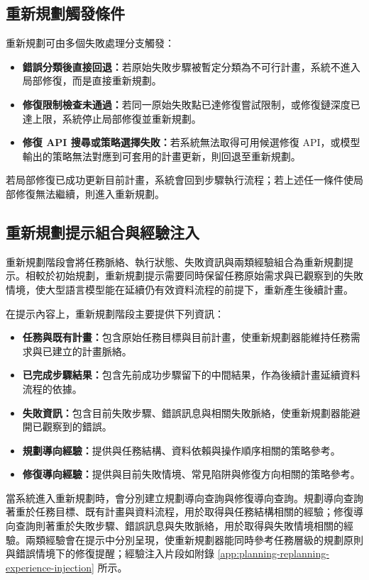\begin{ZhChapter}
\subsection{重新規劃觸發條件}

重新規劃可由多個失敗處理分支觸發：

\begin{itemize}
    \item \textbf{錯誤分類後直接回退：}若原始失敗步驟被暫定分類為不可行計畫，系統不進入局部修復，而是直接重新規劃。
    \item \textbf{修復限制檢查未通過：}若同一原始失敗點已達修復嘗試限制，或修復鏈深度已達上限，系統停止局部修復並重新規劃。
    \item \textbf{修復 API 搜尋或策略選擇失敗：}若系統無法取得可用候選修復 API，或模型輸出的策略無法對應到可套用的計畫更新，則回退至重新規劃。
\end{itemize}

若局部修復已成功更新目前計畫，系統會回到步驟執行流程；若上述任一條件使局部修復無法繼續，則進入重新規劃。

\subsection{重新規劃提示組合與經驗注入}

重新規劃階段會將任務脈絡、執行狀態、失敗資訊與兩類經驗組合為重新規劃提示。相較於初始規劃，重新規劃提示需要同時保留任務原始需求與已觀察到的失敗情境，使大型語言模型能在延續仍有效資料流程的前提下，重新產生後續計畫。

在提示內容上，重新規劃階段主要提供下列資訊：

\begin{itemize}
    \item \textbf{任務與既有計畫：}包含原始任務目標與目前計畫，使重新規劃器能維持任務需求與已建立的計畫脈絡。
    \item \textbf{已完成步驟結果：}包含先前成功步驟留下的中間結果，作為後續計畫延續資料流程的依據。
    \item \textbf{失敗資訊：}包含目前失敗步驟、錯誤訊息與相關失敗脈絡，使重新規劃器能避開已觀察到的錯誤。
    \item \textbf{規劃導向經驗：}提供與任務結構、資料依賴與操作順序相關的策略參考。
    \item \textbf{修復導向經驗：}提供與目前失敗情境、常見陷阱與修復方向相關的策略參考。
\end{itemize}

當系統進入重新規劃時，會分別建立規劃導向查詢與修復導向查詢。規劃導向查詢著重於任務目標、既有計畫與資料流程，用於取得與任務結構相關的經驗；修復導向查詢則著重於失敗步驟、錯誤訊息與失敗脈絡，用於取得與失敗情境相關的經驗。兩類經驗會在提示中分別呈現，使重新規劃器能同時參考任務層級的規劃原則與錯誤情境下的修復提醒；經驗注入片段如附錄 \ref{app:planning-replanning-experience-injection} 所示。


\end{ZhChapter}
